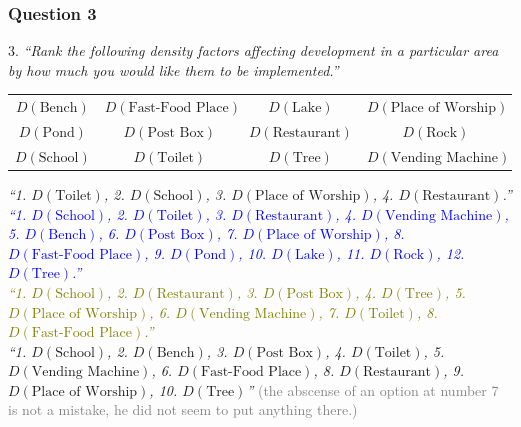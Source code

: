 \documentclass[12pt]{report}
\begin{document}
\subsubsection{Question 3}
3. \textit{``Rank the following density factors affecting development in a particular area by how much you would like them to be implemented.''}
\begin{center}
\begin{tabular}{c c c c}
    $D\left(\text{Bench}\right)$ & $D\left(\text{Fast-Food Place}\right)$ & $D\left(\text{Lake}\right)$ & $D\left(\text{Place of Worship}\right)$ \\ 
    $D\left(\text{Pond}\right)$ & $D\left(\text{Post Box}\right)$ & $D\left(\text{Restaurant}\right)$ & $D\left(\text{Rock}\right)$ \\
    $D\left(\text{School}\right)$ & $D\left(\text{Toilet}\right)$ & $D\left(\text{Tree}\right)$ & $D\left(\text{Vending Machine}\right)$ \\
\end{tabular}
\end{center}
\begin{flushright}
\textit{\textcolor{Sepia}{``1. $D\left(\text{Toilet}\right)$, 2. $D\left(\text{School}\right)$, 3. $D\left(\text{Place of Worship}\right)$, 4. $D\left(\text{Restaurant}\right)$.''}} \\
\textit{\textcolor{Blue}{``1. $D\left(\text{School}\right)$, 2. $D\left(\text{Toilet}\right)$, 3. $D\left(\text{Restaurant}\right)$, 4. $D\left(\text{Vending Machine}\right)$, 5. $D\left(\text{Bench}\right)$, 6. $D\left(\text{Post Box}\right)$, 7. $D\left(\text{Place of Worship}\right)$, 8. $D\left(\text{Fast-Food Place}\right)$, 9. $D\left(\text{Pond}\right)$, 10. $D\left(\text{Lake}\right)$, 11. $D\left(\text{Rock}\right)$, 12. $D\left(\text{Tree}\right)$.''}} \\
\textit{\textcolor{olive}{``1. $D\left(\text{School}\right)$, 2. $D\left(\text{Restaurant}\right)$, 3. $D\left(\text{Post Box}\right)$, 4. $D\left(\text{Tree}\right)$, 5. $D\left(\text{Place of Worship}\right)$, 6. $D\left(\text{Vending Machine}\right)$, 7. $D\left(\text{Toilet}\right)$, 8. $D\left(\text{Fast-Food Place}\right)$.''}} \\
\textit{\textcolor{OliveGreen}{``1. $D\left(\text{School}\right)$, 2. $D\left(\text{Bench}\right)$, 3. $D\left(\text{Post Box}\right)$, 4. $D\left(\text{Toilet}\right)$, 5. $D\left(\text{Vending Machine}\right)$, 6. $D\left(\text{Fast-Food Place}\right)$, 8. $D\left(\text{Restaurant}\right)$, 9. $D\left(\text{Place of Worship}\right)$, 10. $D\left(\text{Tree}\right)$''}}
\textcolor{gray}{(the abscense of an option at number 7 is not a mistake, he did not seem to put anything there.)}
\end{flushright}
\end{document}
